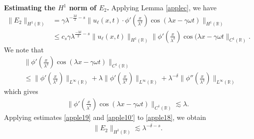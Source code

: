 \documentclass[12pt,reqno]{amsart}
\newcommand{\rr}{\mathbb{R}}
\theoremstyle{plain}  %
\theoremstyle{definition}
\begin{document}
%
\vskip0.1in
{\bf Estimating the $H^1$ norm of $\hyperref[all_errors_together]{E_2}$.} Applying Lemma \ref{applec}, we have
\begin{equation}
	\begin{split}
		\|E_2\|_{H^1(\rr)} 
		& = \gamma \lambda^{-\frac{3 \delta}{2} -s } \|u_\ell(x,t) \cdot
		\phi'\left( \frac{x}{\lambda^\delta} \right) \cos (\lambda x - \gamma \omega t)
		\|_{H^1(\rr)}
		\\
		& \le c_s \gamma \lambda^{\frac{-3 \delta}{2} -s } \|u_\ell(x,t) \|_{H^1(\rr)}
		\|\phi'\left( \frac{x}{\lambda^\delta} \right )
		\cos(\lambda x - \gamma \omega t 
		\|_{C^1(\rr)}.
		\label{apple18}
	\end{split}
\end{equation}
We note that
\begin{equation*}
	\begin{split}
		& \|\phi'\left( \frac{x}{\lambda^\delta} \right) \cos(\lambda x - \gamma \omega t)
		\|_{C^1(\rr)}
		\\
		& \le \|\phi' \left( \frac{x}{\lambda^\delta} \right)\|_{L^\infty(\rr)} +
		\lambda \|\phi'\left( \frac{x}{\lambda^\delta} \right)\|_{L^\infty(\rr)}
		+ \lambda^{-\delta} \|\phi''\left( \frac{x}{\lambda^\delta} \right)
		\|_{L^\infty(\rr)}
	\end{split}
\end{equation*}
which gives
\begin{equation}
	\begin{split}
		\|\phi'\left( \frac{x}{\lambda^\delta} \right) \cos(\lambda x - \gamma \omega t)
		\|_{C^1(\rr)} \lesssim \lambda.
		\label{apple19}
	\end{split}
\end{equation}
Applying estimates \eqref{apple19} and \eqref{apple10'} to \eqref{apple18}, we obtain
\begin{equation*}
	\begin{split}
	\label{apple20}
	\|E_2\|_{H^1(\rr)} \lesssim \lambda^{-\delta -s }.
\end{split}
\end{equation*}
\end{document}
